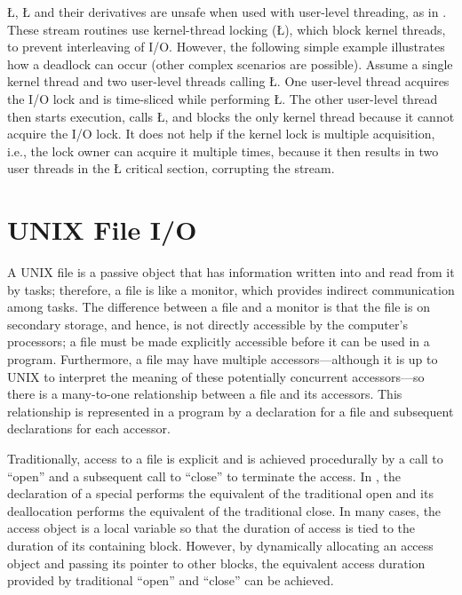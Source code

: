 \documentclass[openright,twoside]{report}
\begin{document}
 \LGinlinetrue\LGbegin\lgrinde\L{}\endlgrinde\LGend{}, \LGinlinetrue\LGbegin\lgrinde\L{}\endlgrinde\LGend{} and their derivatives are unsafe when used with user-level threading, as in \uC.
These stream routines use kernel-thread locking (\LGinlinetrue\LGbegin\lgrinde\L{}\endlgrinde\LGend{}), which block kernel threads, to prevent interleaving of I/O.
However, the following simple example illustrates how a deadlock can occur (other complex scenarios are possible).
Assume a single kernel thread and two user-level threads calling \LGinlinetrue\LGbegin\lgrinde\L{}\endlgrinde\LGend{}.
One user-level thread acquires the I/O lock and is time-sliced while performing \LGinlinetrue\LGbegin\lgrinde\L{}\endlgrinde\LGend{}.
The other user-level thread then starts execution, calls \LGinlinetrue\LGbegin\lgrinde\L{}\endlgrinde\LGend{}, and blocks the only kernel thread because it cannot acquire the I/O lock.
It does not help if the kernel lock is multiple acquisition, i.e., the lock owner can acquire it multiple times, because it then results in two user threads in the \LGinlinetrue\LGbegin\lgrinde\L{}\endlgrinde\LGend{} critical section, corrupting the stream.


\section{UNIX File I/O}

A UNIX file is a passive object that has information written into and read from it by tasks;
therefore, a file is like a monitor, which provides indirect communication among tasks.
The difference between a file and a monitor is that the file is on secondary storage, and hence, is not directly accessible by the computer's processors;
a file must be made explicitly accessible before it can be used in a program.
Furthermore, a file may have multiple accessors---although it is up to UNIX to interpret the meaning of these potentially concurrent accessors---so there is a many-to-one relationship between a file and its accessors.
This relationship is represented in a \uC program by a declaration for a file and subsequent declarations for each accessor.

Traditionally, access to a file is explicit and is achieved procedurally by a call to ``open'' and a subsequent call to ``close'' to terminate the access.
In \uC, the declaration of a special  performs the equivalent of the traditional open and its deallocation performs the equivalent of the traditional close.
In many cases, the access object is a local variable so that the duration of access is tied to the duration of its containing block.
However, by dynamically allocating an access object and passing its pointer to other blocks, the equivalent access duration provided by traditional ``open'' and ``close'' can be achieved.
\end{document}
